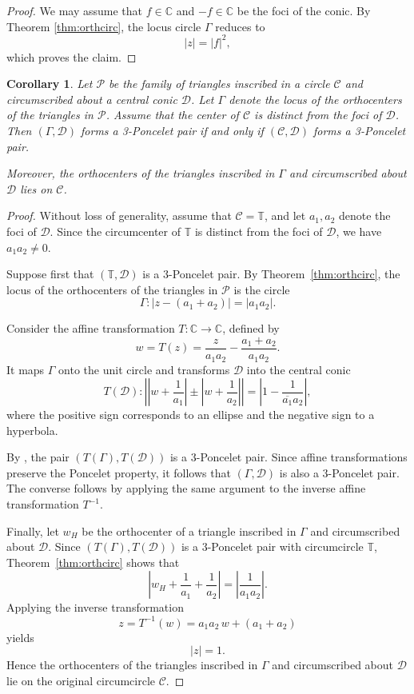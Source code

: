 \documentclass[11pt,reqno]{amsart}
\newtheorem{corollary}{Corollary}[section]
\theoremstyle{definition}
\numberwithin{equation}{section}
\begin{document}
\begin{proof}
We may assume that $f \in \mathbb C$ and $-f\in \mathbb C$ be the foci of the conic. By Theorem
\ref{thm:orthcirc}, the locus circle $\Gamma$ reduces to
\[
|z|=|f|^2,
\]
which proves the claim.
\end{proof}

\begin{corollary}\label{cor:loc3pons}
Let $\mathcal P$ be the family of triangles inscribed in a circle $\mathcal C$ and circumscribed about a central conic $\mathcal D$. Let $\Gamma$ denote the locus  of the orthocenters of the triangles in $\mathcal P$. Assume that the center of $\mathcal C$ is distinct from the foci of $\mathcal D$. Then  $(\Gamma, \mathcal D)$ forms a 3-Poncelet pair if and only if $(\mathcal C,\mathcal D)$ forms a 3-Poncelet pair.

Moreover, the orthocenters of the triangles inscribed in $\Gamma$ and circumscribed about $\mathcal D$ lies on $\mathcal C$. 
\end{corollary}

\begin{proof}
Without loss of generality, assume that $\mathcal C=\mathbb T$, and let
$a_1,a_2$ denote the foci of $\mathcal D$. Since the circumcenter of
$\mathbb T$ is distinct from the foci of $\mathcal D$, we have
$a_1a_2\neq0$.

Suppose first that $(\mathbb T,\mathcal D)$ is a $3$-Poncelet pair.
By Theorem~\ref{thm:orthcirc}, the locus of the orthocenters of the
triangles in $\mathcal P$ is the circle
\[
\Gamma:
|z-(a_1+a_2)|=|a_1a_2|.
\]

Consider the affine transformation $T:\mathbb C\to\mathbb C$, defined by
\[
w=T(z)=\frac{z}{a_1a_2}-\frac{a_1+a_2}{a_1a_2}.
\]
It maps $\Gamma$ onto the unit circle and transforms $\mathcal D$ into the
central conic
\[
T(\mathcal D):
\left|
\left|w+\frac1{a_1}\right|
\pm
\left|w+\frac1{a_2}\right|
\right|
=
\left|
1-\frac1{\overline{a_1}a_2}
\right|,
\]
where the positive sign corresponds to an ellipse and the negative sign to a
hyperbola.

By \cite[Theorem~2.1]{Murad2026b}, the pair
$(T(\Gamma),T(\mathcal D))$ is a $3$-Poncelet pair. Since affine
transformations preserve the Poncelet property, it follows that
$(\Gamma,\mathcal D)$ is also a $3$-Poncelet pair. The converse follows by
applying the same argument to the inverse affine transformation $T^{-1}$.

Finally, let $w_H$ be the orthocenter of a triangle inscribed in $\Gamma$
and circumscribed about $\mathcal D$. Since $(T(\Gamma),T(\mathcal D))$
is a $3$-Poncelet pair with circumcircle $\mathbb T$, Theorem~\ref{thm:orthcirc}
shows that
\[
\left|
w_H+\frac1{a_1}+\frac1{a_2}
\right|
=
\left|
\frac1{a_1a_2}
\right|.
\]
Applying the inverse transformation
\[
z=T^{-1}(w)=a_1a_2\,w+(a_1+a_2)
\]
yields
\[
|z|=1.
\]
Hence the orthocenters of the triangles inscribed in $\Gamma$ and
circumscribed about $\mathcal D$ lie on the original circumcircle
$\mathcal C$.
\end{proof}
\end{document}
